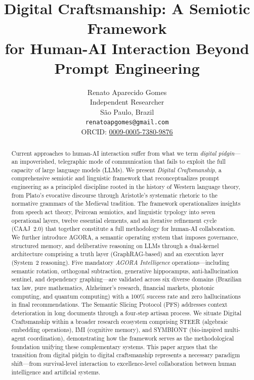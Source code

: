 \documentclass[11pt,a4paper]{article}
\title{\textbf{Digital Craftsmanship: A Semiotic Framework\\for Human-AI Interaction Beyond Prompt Engineering}}
\author{
    Renato Aparecido Gomes\\
    Independent Researcher\\
    S\~ao Paulo, Brazil\\
    \texttt{renatoapgomes@gmail.com}\\
    ORCID: \href{https://orcid.org/0009-0005-7380-9876}{0009-0005-7380-9876}
}
\date{}
\begin{document}
\maketitle

\begin{abstract}
Current approaches to human-AI interaction suffer from what we term \emph{digital pidgin}---an impoverished, telegraphic mode of communication that fails to exploit the full capacity of large language models (LLMs). We present \emph{Digital Craftsmanship}, a comprehensive semiotic and linguistic framework that reconceptualizes prompt engineering as a principled discipline rooted in the history of Western language theory, from Plato's evocative discourse through Aristotle's systematic rhetoric to the normative grammars of the Medieval tradition. The framework operationalizes insights from speech act theory, Peircean semiotics, and linguistic typology into seven operational layers, twelve essential elements, and an iterative refinement cycle (CAAJ~2.0) that together constitute a full methodology for human-AI collaboration. We further introduce AGORA, a semantic operating system that imposes governance, structured memory, and deliberative reasoning on LLMs through a dual-kernel architecture comprising a truth layer (GraphRAG-based) and an execution layer (System~2 reasoning). Five mandatory \emph{AGORA Intelligence} operations---including semantic rotation, orthogonal subtraction, generative hippocampus, anti-hallucination sentinel, and dependency graphing---are validated across six diverse domains (Brazilian tax law, pure mathematics, Alzheimer's research, financial markets, photonic computing, and quantum computing) with a 100\% success rate and zero hallucinations in final recommendations. The Semantic Slicing Protocol (PFS) addresses context deterioration in long documents through a four-step artisan process. We situate Digital Craftsmanship within a broader research ecosystem comprising STEER (algebraic embedding operations), IMI (cognitive memory), and SYMBIONT (bio-inspired multi-agent coordination), demonstrating how the framework serves as the methodological foundation unifying these complementary systems. This paper argues that the transition from digital pidgin to digital craftsmanship represents a necessary paradigm shift---from survival-level interaction to excellence-level collaboration between human intelligence and artificial systems.
\end{abstract}
\end{document}
